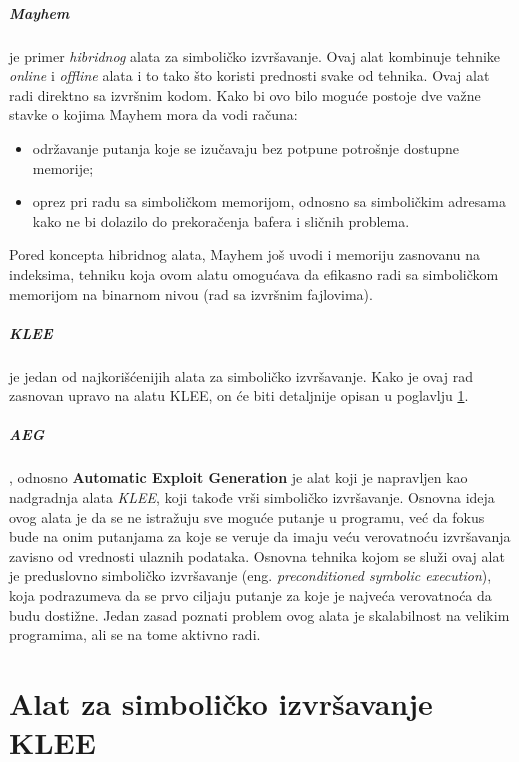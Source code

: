 \documentclass[12pt,oneside]{memoir}
\begin{document}
\paragraph{Mayhem}\cite{mayhem} je primer \textit{hibridnog} alata za simboličko izvršavanje. Ovaj alat kombinuje tehnike \textit{online} i \textit{offline} alata i to tako što koristi prednosti svake od tehnika. Ovaj alat radi direktno sa izvršnim kodom. Kako bi ovo bilo moguće postoje dve važne stavke o kojima Mayhem mora da vodi računa:
\begin{itemize}
    \item održavanje putanja koje se izučavaju bez potpune potrošnje dostupne memorije;
    
    \item oprez pri radu sa simboličkom memorijom, odnosno sa simboličkim adresama kako ne bi dolazilo do prekoračenja bafera i sličnih problema.
\end{itemize} 
\medskip
Pored koncepta hibridnog alata, Mayhem još uvodi i memoriju zasnovanu na indeksima, tehniku koja ovom alatu omogućava da efikasno radi sa simboličkom memorijom na binarnom nivou (rad sa izvršnim fajlovima).

\paragraph{KLEE}\cite{klee} je jedan od najkorišćenijih alata za simboličko izvršavanje. Kako je ovaj rad zasnovan upravo na alatu KLEE, on će biti detaljnije opisan u poglavlju \ref{KLEE}.

\paragraph{AEG}\cite{aeg}, odnosno \textbf{Automatic Exploit Generation} je alat koji je napravljen kao nadgradnja alata \textit{KLEE}\cite{klee}, koji takođe vrši simboličko izvršavanje. Osnovna ideja ovog alata je da se ne istražuju sve moguće putanje u programu, već da fokus bude na onim putanjama za koje se veruje da imaju veću verovatnoću izvršavanja zavisno od vrednosti ulaznih podataka. Osnovna tehnika kojom se služi ovaj alat je preduslovno simboličko izvršavanje (eng. \textit{preconditioned symbolic execution}), koja podrazumeva da se prvo ciljaju putanje za koje je najveća verovatnoća da budu dostižne. Jedan zasad poznati problem ovog alata je skalabilnost na velikim programima, ali se na tome aktivno radi.

\chapter{Alat za simboličko izvršavanje KLEE} \label{KLEE}
\end{document}
